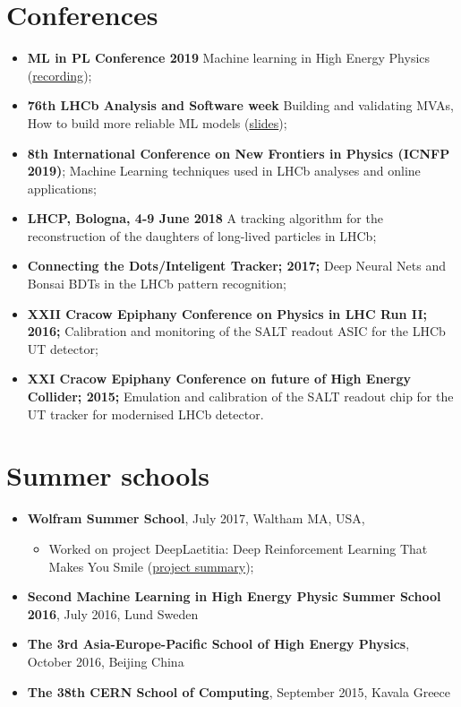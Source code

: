 \section*{Conferences}
\begin{itemize}
                \item \textbf{ML in PL Conference 2019 } Machine learning in High Energy Physics (\textcolor{red}{\href{https://www.youtube.com/watch?v=6cO2OBhJlDQ\&list=PLoaWrlj9TDhPf08oDhBspvSP11E_uXSnB&index=39}{recording}});
                \item \textbf{76th LHCb Analysis and Software week} Building and validating MVAs, How to build more reliable ML models (\textcolor{red}{\href{https://docs.google.com/presentation/d/14ZELcsYN_eMCpxtsYzOmIaC_o8rhU6abqH1jwxCijZI/edit?usp=sharing}{slides}});
                
			    \item \textbf{8th International Conference on New Frontiers in Physics (ICNFP 2019)}; Machine Learning techniques used in LHCb analyses and online applications;
			    \item  \textbf{LHCP, Bologna, 4-9 June 2018} A tracking algorithm for the reconstruction of the daughters of long-lived particles in LHCb;
				\item \textbf{Connecting the Dots/Inteligent Tracker; 2017;} Deep Neural Nets and Bonsai BDTs in the LHCb pattern recognition;
				\item \textbf{XXII Cracow Epiphany Conference on Physics in LHC Run II; 2016;} Calibration and monitoring of the SALT readout ASIC for the LHCb UT detector;
				\item \textbf{XXI Cracow Epiphany Conference on future of High Energy Collider; 2015;} Emulation and calibration of the SALT readout chip for the UT tracker for modernised LHCb detector.
			\end{itemize}
			
\section*{Summer schools}
\begin{itemize}
    \item \textbf{Wolfram Summer School}, July 2017, Waltham MA, USA, 
    \begin{itemize}
        \item Worked on project DeepLaetitia: Deep Reinforcement Learning That Makes You Smile (\textcolor{red}{\href{https://education.wolfram.com/summer/school/alumni/2017/dendek/}{project summary}});
    \end{itemize}
    \item \textbf{Second Machine Learning in High Energy Physic Summer School 2016}, July 2016, Lund Sweden 
    \item \textbf{The 3rd Asia-Europe-Pacific School of High Energy Physics}, October 2016, Beijing China
    \item \textbf{The 38th CERN School of Computing}, September 2015, Kavala Greece
\end{itemize}